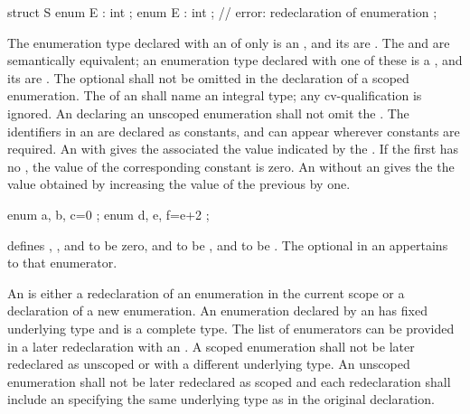 \begin{codeblock}
   struct S {
     enum E : int {};
     enum E : int {};  // error: redeclaration of enumeration
   };
\end{codeblock}

\exitexample
\exitnote

\pnum
{}%
%
%
%
The enumeration type declared with an 
of only  is an ,
and its  are .
The   and
 are semantically equivalent; an enumeration
type declared with one of these is a ,
and its  are .
The optional  shall not be omitted in the declaration of a scoped enumeration.
The  of an 
shall name an integral type; any cv-qualification is ignored.
An  declaring an unscoped enumeration shall
not omit the .
The identifiers in an  are declared as
constants, and can appear wherever constants are required.
%
An  with \tcode{=} gives the associated
 the value indicated by the
.
If the first 
has no , the value of the corresponding constant
is zero. An  without an
 gives the  the value
obtained by increasing the value of the previous 
by one.
\enterexample

\begin{codeblock}
enum { a, b, c=0 };
enum { d, e, f=e+2 };
\end{codeblock}

defines , , and  to be zero,  and
 to be , and  to be .
\exitexample
The optional  in an
 appertains to that enumerator.

\pnum
An  is either a redeclaration
of an enumeration in the current scope or a declaration of a new enumeration.
\enternote An enumeration declared by an
 has fixed underlying type and is a
complete type. The list of enumerators can be provided in a later redeclaration
with an . \exitnote A scoped enumeration
shall not be later redeclared as unscoped or with a different underlying type.
An unscoped enumeration shall not be later redeclared as scoped and each
redeclaration shall include an  specifying the same
underlying type as in the original declaration.

